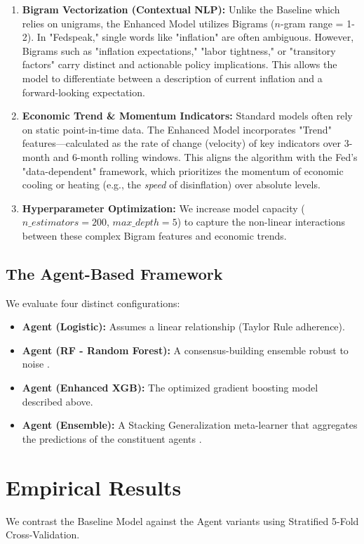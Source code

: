 \documentclass[11pt, a4paper]{article}
\begin{document}
\begin{enumerate}
    \item \textbf{Bigram Vectorization (Contextual NLP):} Unlike the Baseline which relies on unigrams, the Enhanced Model utilizes Bigrams ($n$-gram range = 1-2). In "Fedspeak," single words like "inflation" are often ambiguous. However, Bigrams such as "inflation expectations," "labor tightness," or "transitory factors" carry distinct and actionable policy implications. This allows the model to differentiate between a description of current inflation and a forward-looking expectation.
    \item \textbf{Economic Trend \& Momentum Indicators:} Standard models often rely on static point-in-time data. The Enhanced Model incorporates "Trend" features—calculated as the rate of change (velocity) of key indicators over 3-month and 6-month rolling windows. This aligns the algorithm with the Fed's "data-dependent" framework, which prioritizes the momentum of economic cooling or heating (e.g., the \textit{speed} of disinflation) over absolute levels.
    \item \textbf{Hyperparameter Optimization:} We increase model capacity ($n\_estimators=200$, $max\_depth=5$) to capture the non-linear interactions between these complex Bigram features and economic trends.
\end{enumerate}

\subsection{The Agent-Based Framework}
We evaluate four distinct configurations:
\begin{itemize}
    \item \textbf{Agent (Logistic):} Assumes a linear relationship (Taylor Rule adherence).
    \item \textbf{Agent (RF - Random Forest):} A consensus-building ensemble robust to noise \cite{ref8}.
    \item \textbf{Agent (Enhanced XGB):} The optimized gradient boosting model described above.
    \item \textbf{Agent (Ensemble):} A Stacking Generalization meta-learner that aggregates the predictions of the constituent agents \cite{ref13}.
\end{itemize}

\section{Empirical Results}
We contrast the Baseline Model against the Agent variants using Stratified 5-Fold Cross-Validation.
\end{document}
